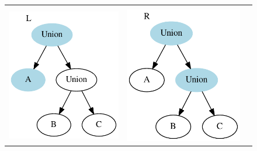 \documentclass[a4paper,english]{lipics-v2019}
\begin{document}
\begin{figure}
\begin{tabular}{cccc}
& \hspace{5em} & &\\
\includegraphics[scale=0.6]{figures-gen/example1.pdf} &
\multicolumn{2}{c}{\includegraphics[scale=0.6]{figures-gen/example2.pdf}} &

\end{tabular}
\end{figure}
\end{document}
